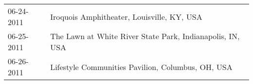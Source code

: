 \begin{supertabular}{ll}
 06-24-2011 &                 Iroquois Amphitheater, Louisville, KY, USA \\
 06-25-2011 &  The Lawn at White River State Park, Indianapolis, IN, USA \\
 06-26-2011 &          Lifestyle Communities Pavilion, Columbus, OH, USA \\
\end{supertabular}
